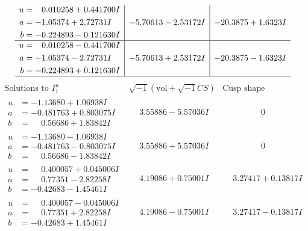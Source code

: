 \documentclass[1p]{elsarticle_modified}
\theoremstyle{definition}
\newcommand{\I}{\sqrt{-1}}
\begin{document}
$$\begin{array}{c|c|c}
\begin{aligned}
u &= \phantom{-}0.010258 + 0.441700 I \\
a &= -1.05374 + 2.72731 I \\
b &= -0.224893 - 0.121630 I\end{aligned}
 & -5.70613 - 2.53172 I & -20.3875 + 1.6323 I \\ \hline\begin{aligned}
u &= \phantom{-}0.010258 - 0.441700 I \\
a &= -1.05374 - 2.72731 I \\
b &= -0.224893 + 0.121630 I\end{aligned}
 & -5.70613 + 2.53172 I & -20.3875 - 1.6323 I\\
 \hline 
 \end{array}$$\newpage$$\begin{array}{c|c|c}  
\text{Solutions to }I^u_{1}& \I (\text{vol} + \sqrt{-1}CS) & \text{Cusp shape}\\
 \hline 
\begin{aligned}
u &= -1.13680 + 1.06938 I \\
a &= -0.481763 + 0.803075 I \\
b &= \phantom{-}0.56686 + 1.83842 I\end{aligned}
 & \phantom{-}3.55886 - 5.57036 I & \phantom{-0.000000 } 0 \\ \hline\begin{aligned}
u &= -1.13680 - 1.06938 I \\
a &= -0.481763 - 0.803075 I \\
b &= \phantom{-}0.56686 - 1.83842 I\end{aligned}
 & \phantom{-}3.55886 + 5.57036 I & \phantom{-0.000000 } 0 \\ \hline\begin{aligned}
u &= \phantom{-}0.400057 + 0.045006 I \\
a &= \phantom{-}0.77351 - 2.82258 I \\
b &= -0.42683 - 1.45461 I\end{aligned}
 & \phantom{-}4.19086 + 0.75001 I & \phantom{-}3.27417 + 0.13817 I \\ \hline\begin{aligned}
u &= \phantom{-}0.400057 - 0.045006 I \\
a &= \phantom{-}0.77351 + 2.82258 I \\
b &= -0.42683 + 1.45461 I\end{aligned}
 & \phantom{-}4.19086 - 0.75001 I & \phantom{-}3.27417 - 0.13817 I \\ \hline\begin{aligned}

\end{aligned}
\end{array}$$
\end{document}
